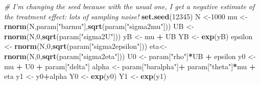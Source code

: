 \documentclass[]{book}
\newenvironment{Shaded}{\begin{snugshade}}{\end{snugshade}}
\newcommand{\CommentTok}[1]{\textcolor[rgb]{0.56,0.35,0.01}{\textit{#1}}}
\newcommand{\DecValTok}[1]{\textcolor[rgb]{0.00,0.00,0.81}{#1}}
\newcommand{\KeywordTok}[1]{\textcolor[rgb]{0.13,0.29,0.53}{\textbf{#1}}}
\newcommand{\NormalTok}[1]{#1}
\newcommand{\OperatorTok}[1]{\textcolor[rgb]{0.81,0.36,0.00}{\textbf{#1}}}
\newcommand{\StringTok}[1]{\textcolor[rgb]{0.31,0.60,0.02}{#1}}
\theoremstyle{definition}
\theoremstyle{definition}
\theoremstyle{definition}
\theoremstyle{remark}
\begin{document}
\begin{Shaded}
\begin{Highlighting}[]
\CommentTok{# I'm changing the seed because with the usual one, I get a negative estimate of the treatment effect: lots of sampling noise!}
\KeywordTok{set.seed}\NormalTok{(}\DecValTok{12345}\NormalTok{)}
\NormalTok{N <-}\DecValTok{1000}
\NormalTok{mu <-}\StringTok{ }\KeywordTok{rnorm}\NormalTok{(N,param[}\StringTok{"barmu"}\NormalTok{],}\KeywordTok{sqrt}\NormalTok{(param[}\StringTok{"sigma2mu"}\NormalTok{]))}
\NormalTok{UB <-}\StringTok{ }\KeywordTok{rnorm}\NormalTok{(N,}\DecValTok{0}\NormalTok{,}\KeywordTok{sqrt}\NormalTok{(param[}\StringTok{"sigma2U"}\NormalTok{]))}
\NormalTok{yB <-}\StringTok{ }\NormalTok{mu }\OperatorTok{+}\StringTok{ }\NormalTok{UB }
\NormalTok{YB <-}\StringTok{ }\KeywordTok{exp}\NormalTok{(yB)}
\NormalTok{epsilon <-}\StringTok{ }\KeywordTok{rnorm}\NormalTok{(N,}\DecValTok{0}\NormalTok{,}\KeywordTok{sqrt}\NormalTok{(param[}\StringTok{"sigma2epsilon"}\NormalTok{]))}
\NormalTok{eta<-}\StringTok{ }\KeywordTok{rnorm}\NormalTok{(N,}\DecValTok{0}\NormalTok{,}\KeywordTok{sqrt}\NormalTok{(param[}\StringTok{"sigma2eta"}\NormalTok{]))}
\NormalTok{U0 <-}\StringTok{ }\NormalTok{param[}\StringTok{"rho"}\NormalTok{]}\OperatorTok{*}\NormalTok{UB }\OperatorTok{+}\StringTok{ }\NormalTok{epsilon}
\NormalTok{y0 <-}\StringTok{ }\NormalTok{mu }\OperatorTok{+}\StringTok{  }\NormalTok{U0 }\OperatorTok{+}\StringTok{ }\NormalTok{param[}\StringTok{"delta"}\NormalTok{]}
\NormalTok{alpha <-}\StringTok{ }\NormalTok{param[}\StringTok{"baralpha"}\NormalTok{]}\OperatorTok{+}\StringTok{  }\NormalTok{param[}\StringTok{"theta"}\NormalTok{]}\OperatorTok{*}\NormalTok{mu }\OperatorTok{+}\StringTok{ }\NormalTok{eta}
\NormalTok{y1 <-}\StringTok{ }\NormalTok{y0}\OperatorTok{+}\NormalTok{alpha}
\NormalTok{Y0 <-}\StringTok{ }\KeywordTok{exp}\NormalTok{(y0)}
\NormalTok{Y1 <-}\StringTok{ }\KeywordTok{exp}\NormalTok{(y1)}


\end{Highlighting}
\end{Shaded}
\end{document}
